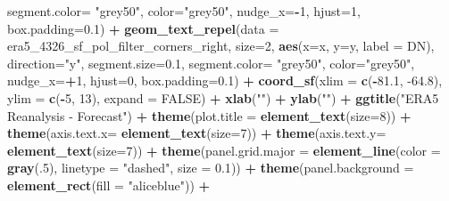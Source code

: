 \documentclass[12pt,oneside]{reedthesis}
\newenvironment{Shaded}{\begin{snugshade}}{\end{snugshade}}
\newcommand{\DataTypeTok}[1]{\textcolor[rgb]{0.13,0.29,0.53}{#1}}
\newcommand{\DecValTok}[1]{\textcolor[rgb]{0.00,0.00,0.81}{#1}}
\newcommand{\FloatTok}[1]{\textcolor[rgb]{0.00,0.00,0.81}{#1}}
\newcommand{\KeywordTok}[1]{\textcolor[rgb]{0.13,0.29,0.53}{\textbf{#1}}}
\newcommand{\NormalTok}[1]{#1}
\newcommand{\OperatorTok}[1]{\textcolor[rgb]{0.81,0.36,0.00}{\textbf{#1}}}
\newcommand{\OtherTok}[1]{\textcolor[rgb]{0.56,0.35,0.01}{#1}}
\newcommand{\StringTok}[1]{\textcolor[rgb]{0.31,0.60,0.02}{#1}}
\begin{document}
\begin{Shaded}
\begin{Highlighting}[]
   \DataTypeTok{segment.color=} \StringTok{"grey50"}\NormalTok{, }\DataTypeTok{color=}\StringTok{"grey50"}\NormalTok{, }\DataTypeTok{nudge_x=}\OperatorTok{-}\DecValTok{1}\NormalTok{, }\DataTypeTok{hjust=}\DecValTok{1}\NormalTok{, }\DataTypeTok{box.padding=}\FloatTok{0.1}\NormalTok{) }\OperatorTok{+}
\StringTok{  }\KeywordTok{geom_text_repel}\NormalTok{(}\DataTypeTok{data =}\NormalTok{ era5_}\DecValTok{4326}\NormalTok{_sf_pol_filter_corners_right, }\DataTypeTok{size=}\DecValTok{2}\NormalTok{, }\KeywordTok{aes}\NormalTok{(}\DataTypeTok{x=}\NormalTok{x, }\DataTypeTok{y=}\NormalTok{y, }\DataTypeTok{label =}\NormalTok{ DN), }\DataTypeTok{direction=}\StringTok{"y"}\NormalTok{, }\DataTypeTok{segment.size=}\FloatTok{0.1}\NormalTok{, }
   \DataTypeTok{segment.color=} \StringTok{"grey50"}\NormalTok{, }\DataTypeTok{color=}\StringTok{"grey50"}\NormalTok{, }\DataTypeTok{nudge_x=}\OperatorTok{+}\DecValTok{1}\NormalTok{, }\DataTypeTok{hjust=}\DecValTok{0}\NormalTok{, }\DataTypeTok{box.padding=}\FloatTok{0.1}\NormalTok{) }\OperatorTok{+}
\StringTok{  }\KeywordTok{coord_sf}\NormalTok{(}\DataTypeTok{xlim =} \KeywordTok{c}\NormalTok{(}\OperatorTok{-}\FloatTok{81.1}\NormalTok{, }\FloatTok{-64.8}\NormalTok{), }\DataTypeTok{ylim =} \KeywordTok{c}\NormalTok{(}\OperatorTok{-}\DecValTok{5}\NormalTok{, }\DecValTok{13}\NormalTok{), }\DataTypeTok{expand =} \OtherTok{FALSE}\NormalTok{) }\OperatorTok{+}
\StringTok{  }\KeywordTok{xlab}\NormalTok{(}\StringTok{""}\NormalTok{) }\OperatorTok{+}\StringTok{ }
\StringTok{  }\KeywordTok{ylab}\NormalTok{(}\StringTok{""}\NormalTok{) }\OperatorTok{+}\StringTok{ }
\StringTok{  }\KeywordTok{ggtitle}\NormalTok{(}\StringTok{"ERA5 Reanalysis - Forecast"}\NormalTok{) }\OperatorTok{+}
\StringTok{  }\KeywordTok{theme}\NormalTok{(}\DataTypeTok{plot.title =} \KeywordTok{element_text}\NormalTok{(}\DataTypeTok{size=}\DecValTok{8}\NormalTok{)) }\OperatorTok{+}
\StringTok{  }\KeywordTok{theme}\NormalTok{(}\DataTypeTok{axis.text.x=} \KeywordTok{element_text}\NormalTok{(}\DataTypeTok{size=}\DecValTok{7}\NormalTok{)) }\OperatorTok{+}\StringTok{ }
\StringTok{  }\KeywordTok{theme}\NormalTok{(}\DataTypeTok{axis.text.y=} \KeywordTok{element_text}\NormalTok{(}\DataTypeTok{size=}\DecValTok{7}\NormalTok{)) }\OperatorTok{+}
\StringTok{  }\KeywordTok{theme}\NormalTok{(}\DataTypeTok{panel.grid.major =} \KeywordTok{element_line}\NormalTok{(}\DataTypeTok{color =} \KeywordTok{gray}\NormalTok{(.}\DecValTok{5}\NormalTok{), }\DataTypeTok{linetype =} \StringTok{"dashed"}\NormalTok{, }\DataTypeTok{size =} \FloatTok{0.1}\NormalTok{)) }\OperatorTok{+}
\StringTok{  }\KeywordTok{theme}\NormalTok{(}\DataTypeTok{panel.background =} \KeywordTok{element_rect}\NormalTok{(}\DataTypeTok{fill =} \StringTok{"aliceblue"}\NormalTok{)) }\OperatorTok{+}

\end{Highlighting}
\end{Shaded}
\end{document}
